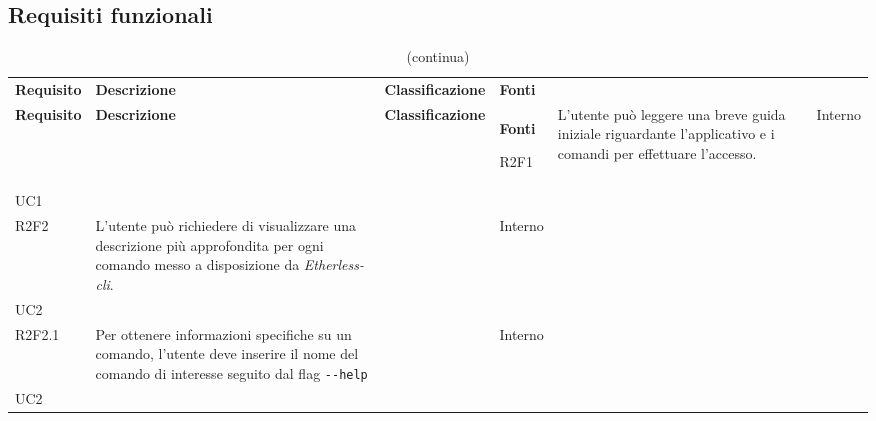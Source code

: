 \subsection{Requisiti funzionali}

\def\arraystretch{1.75}
\begin{longtable}{ 
		>{\centering}p{} 
		>{}p{} 
		>{\centering}p{}
		>{\centering}p{} }
	
	\caption{Tabella dei requisiti funzionali} \\
	\coloredTableHead
	\textbf{\color{white}Requisito} & 
	\centering\textbf{\color{white}Descrizione} & 
	\centering\textbf{\color{white}Classificazione} &
	\textbf{\color{white}Fonti} 
	\endfirsthead
	
	\caption[]{(continua)}\\
	\textbf{\color{white}Requisito} &
	\centering\textbf{\color{white}Descrizione} &
	\centering\textbf{\color{white}Classificazione} &
	\textbf{\color{white}Fonti} 
	\endhead

	R2F1 & L'utente può leggere una breve guida iniziale riguardante l'applicativo
			e i comandi per effettuare l'accesso. 									& \de & Interno \\ UC1 \tabularnewline

	R2F2 & L'utente può richiedere di visualizzare una descrizione più approfondita
		 per ogni comando messo a disposizione da \textit{Etherless-cli}.			& \de & Interno \\ UC2 \tabularnewline
	R2F2.1 & Per ottenere informazioni specifiche su un comando, l'utente deve
		inserire il nome del comando di interesse seguito dal flag \texttt{-{}-help}	& \de & Interno \\ UC2 \tabularnewline


\end{longtable}
